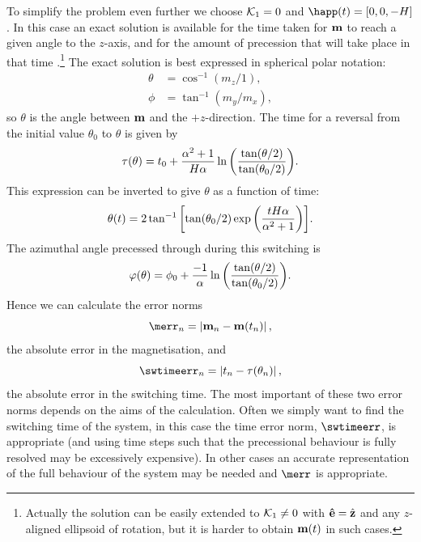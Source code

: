 To simplify the problem even further we choose $\mathcal{K}_1 = 0$ and $\happ(t) = [0, 0, -H]$.
In this case an exact solution is available for the time taken for $\mathbf{m}$ to reach a given angle to the $z$-axis, and for the amount of precession that will take place in that time \cite{Mallinson2000}.\footnote{Actually the solution can be easily extended to $\mathcal{K}_1 \neq 0$ with $\mathbf{\hat{e}} = {\hat{\mathbf{z}}}$ and any $z$-aligned ellipsoid of rotation, but it is harder to obtain $\mathbf{m}(t)$ in such cases.}
The exact solution is best expressed in spherical polar notation:
\begin{equation}
  \begin{aligned}
    \theta &= \cos^{-1}(m_z/1),\\
    \phi &= \tan^{-1}(m_y/m_x),
  \end{aligned}
\end{equation}
so $\theta$ is the angle between $\mathbf{m}$ and the $+z$-direction.
The time for a reversal from the initial value $\theta_0$ to $\theta$ is given by
\begin{equation}
  \tau(\theta) = t_0 + \frac{\alpha^2 +1}{H \alpha}
  \ln {\left(  \frac{\tan(\theta/2)}{\tan(\theta_0/2)}  \right)}.
\end{equation}
This expression can be inverted to give $\theta$ as a function of time:
\begin{equation}
  \theta(t) = 2 \tan^{-1} {\left[  \tan(\theta_0/2) \exp{\left( \frac{tH\alpha}{\alpha^2 + 1} \right)} \right]}.
\end{equation} 
The azimuthal angle precessed through during this switching is
\begin{equation}
  \varphi(\theta) = \phi_0 +  \frac{-1}{\alpha} \ln {\left(  \frac{\tan(\theta/2)}{\tan(\theta_0/2)}  \right)}.
\end{equation}
Hence we can calculate the error norms
\begin{equation}
  \merr_n = \abs{\mv_n - \mv(t_n)},
\end{equation}
\ie the absolute error in the magnetisation, and
\begin{equation}
  \swtimeerr_n = \abs{t_n - \tau(\theta_n)},
\end{equation}
\ie the absolute error in the switching time.
The most important of these two error norms depends on the aims of the calculation.
Often we simply want to find the switching time of the system, in this case the time error norm, $\swtimeerr$, is appropriate (and using time steps such that the precessional behaviour is fully resolved may be excessively expensive).
In other cases an accurate representation of the full behaviour of the system may be needed and $\merr$ is appropriate. 

